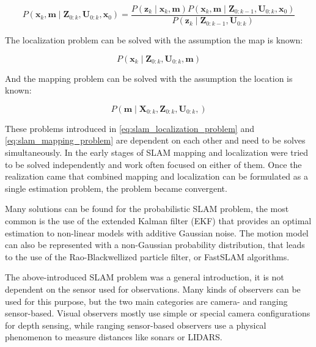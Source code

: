 \begin{equation} \label{eq:slam_mesurement_update}
    P\left ( \mathbf{x}_{k}, \mathbf{m} \mid \mathbf{Z}_{0:k}, \mathbf{U}_{0:k}, \mathbf{x}_{0} \right )= 
    \frac
        {P\left ( \mathbf{z}_{k}\mid \mathbf{x}_{k}, \mathbf{m} \right )P\left ( \mathbf{x}_{k}, \mathbf{m}\mid \mathbf{Z}_{0:k-1}, \mathbf{U}_{0:k}, \mathbf{x}_{0}\right ) }
        {P\left ( \mathbf{z}_{k} \mid \mathbf{Z}_{0:k-1}, \mathbf{U}_{0:k}\right )}
\end{equation}


The localization problem can be solved with the assumption the map is known:

\begin{equation} \label{eq:slam_localization_problem}
    P\left ( \mathbf{x}_{k} \mid \mathbf{Z}_{0:k}, \mathbf{U}_{0:k}, \mathbf{m}\right )
\end{equation}

And the mapping problem can be solved with the assumption the location is known:

\begin{equation} \label{eq:slam_mapping_problem}
    P\left ( \mathbf{m} \mid \mathbf{X}_{0:k}, \mathbf{Z}_{0:k}, \mathbf{U}_{0:k}, \right )
\end{equation}

These problems introduced in \ref{eq:slam_localization_problem} and \ref{eq:slam_mapping_problem} are
dependent on each other and need to be solves simultaneously. In the early stages of SLAM mapping and localization
were tried to be solved independently and work often focused on either of them. Once the realization came that combined 
mapping and localization can be formulated as a single estimation problem, the problem became convergent.

Many solutions can be found for the probabilistic SLAM problem, the most common is the use of the extended Kalman
filter (EKF) that provides an optimal estimation to non-linear models with additive Gaussian noise. The motion
model can also be represented with a non-Gaussian probability distribution, that leads to the use of the 
Rao-Blackwellized particle filter, or FastSLAM algorithms.


The above-introduced SLAM problem was a general introduction, it is not dependent on the sensor used for observations.
Many kinds of observers can be used for this purpose, but the two main categories are camera- and ranging sensor-based.
Visual observers mostly use simple or special camera configurations for depth sensing, while ranging sensor-based observers 
use a physical phenomenon to measure distances like sonars or LIDARS.

